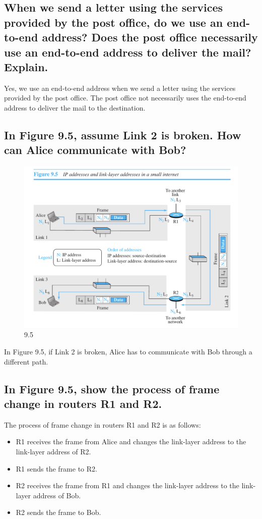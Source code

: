 \documentclass{article}
\begin{document}
\subsection{
	When we send a letter using the services provided by the post office, do we
	use an end-to-end address? Does the post office necessarily use an end-to-end
	address to deliver the mail? Explain.
}

Yes, we use an end-to-end address when we send a letter using the services provided by the post office. The post office not necessarily uses the end-to-end address to deliver the mail to the destination.

\subsection{
	In Figure 9.5, assume Link 2 is broken. How can Alice communicate with
	Bob?
}
\begin{figure}[H]
	\center
	\includegraphics[scale=0.5]{9.5.png}
	\caption{9.5}
\end{figure}
In Figure 9.5, if Link 2 is broken, Alice has to communicate with Bob through a different path.

\subsection{
	In Figure 9.5, show the process of frame change in routers R1 and R2.
}
The process of frame change in routers R1 and R2 is as follows:
\begin{itemize}
	\item R1 receives the frame from Alice and changes the link-layer address to the link-layer address of R2.
	\item R1 sends the frame to R2.
	\item R2 receives the frame from R1 and changes the link-layer address to the link-layer address of Bob.
	\item R2 sends the frame to Bob.
\end{itemize}
\end{document}

